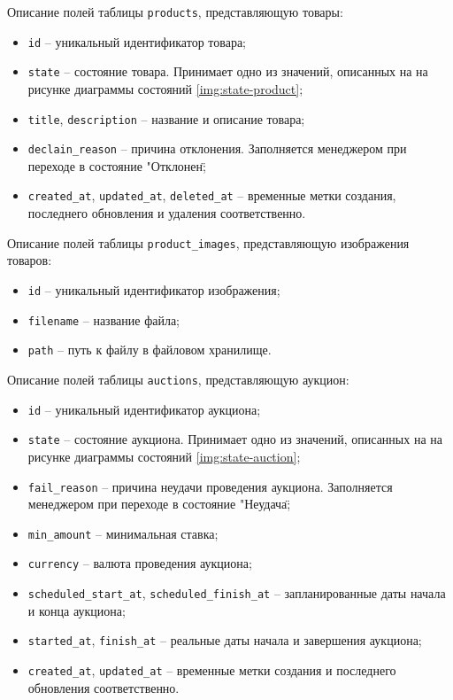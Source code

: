 Описание полей таблицы \texttt{products}, представляющую товары:
\begin{itemize}
    \item \texttt{id} -- уникальный идентификатор товара;
    \item \texttt{state} -- состояние товара. Принимает одно из значений, описанных на на рисунке диаграммы состояний \ref{img:state-product};
    \item \texttt{title}, \texttt{description} -- название и описание товара;
    \item \texttt{declain\_reason} -- причина отклонения. Заполняется менеджером при переходе в состояние "Отклонен\";
    \item \texttt{created\_at}, \texttt{updated\_at}, \texttt{deleted\_at} -- временные метки создания, последнего обновления и удаления соответственно.
\end{itemize}

Описание полей таблицы \texttt{product\_images}, представляющую изображения товаров:
\begin{itemize}
    \item \texttt{id} -- уникальный идентификатор изображения;
    \item \texttt{filename} -- название файла;
    \item \texttt{path} -- путь к файлу в файловом хранилище.
\end{itemize}

Описание полей таблицы \texttt{auctions}, представляющую аукцион:
\begin{itemize}
    \item \texttt{id} -- уникальный идентификатор аукциона;
    \item \texttt{state} -- состояние аукциона. Принимает одно из значений, описанных на на рисунке диаграммы состояний \ref{img:state-auction};
    \item \texttt{fail\_reason} -- причина неудачи проведения аукциона. Заполняется менеджером при переходе в состояние "Неудача\";
    \item \texttt{min\_amount} -- минимальная ставка;
    \item \texttt{currency} -- валюта проведения аукциона;
    \item \texttt{scheduled\_start\_at}, \texttt{scheduled\_finish\_at} -- запланированные даты начала и конца аукциона;
    \item \texttt{started\_at}, \texttt{finish\_at} -- реальные даты начала и завершения аукциона;
    \item \texttt{created\_at}, \texttt{updated\_at} -- временные метки создания и последнего обновления соответственно.
\end{itemize}

